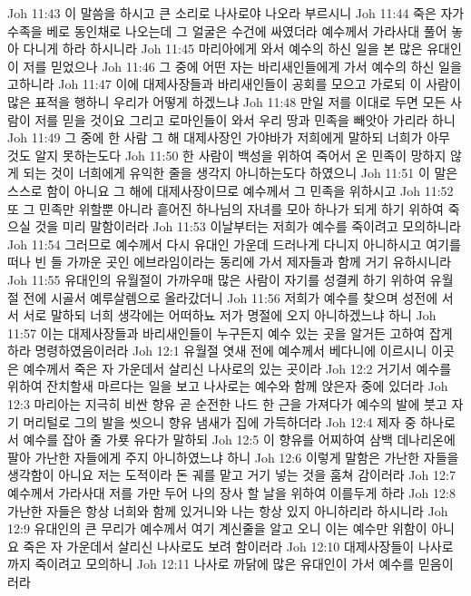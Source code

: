 Joh 11:43  이 말씀을 하시고 큰 소리로 나사로야 나오라 부르시니
Joh 11:44  죽은 자가 수족을 베로 동인채로 나오는데 그 얼굴은 수건에 싸였더라 예수께서 가라사대 풀어 놓아 다니게 하라 하시니라
Joh 11:45  마리아에게 와서 예수의 하신 일을 본 많은 유대인이 저를 믿었으나
Joh 11:46  그 중에 어떤 자는 바리새인들에게 가서 예수의 하신 일을 고하니라
Joh 11:47  이에 대제사장들과 바리새인들이 공회를 모으고 가로되 이 사람이 많은 표적을 행하니 우리가 어떻게 하겠느냐
Joh 11:48  만일 저를 이대로 두면 모든 사람이 저를 믿을 것이요 그리고 로마인들이 와서 우리 땅과 민족을 빼앗아 가리라 하니
Joh 11:49  그 중에 한 사람 그 해 대제사장인 가야바가 저희에게 말하되 너희가 아무 것도 알지 못하는도다
Joh 11:50  한 사람이 백성을 위하여 죽어서 온 민족이 망하지 않게 되는 것이 너희에게 유익한 줄을 생각지 아니하는도다 하였으니
Joh 11:51  이 말은 스스로 함이 아니요 그 해에 대제사장이므로 예수께서 그 민족을 위하시고
Joh 11:52  또 그 민족만 위할뿐 아니라 흩어진 하나님의 자녀를 모아 하나가 되게 하기 위하여 죽으실 것을 미리 말함이러라
Joh 11:53  이날부터는 저희가 예수를 죽이려고 모의하니라
Joh 11:54  그러므로 예수께서 다시 유대인 가운데 드러나게 다니지 아니하시고 여기를 떠나 빈 들 가까운 곳인 에브라임이라는 동리에 가서 제자들과 함께 거기 유하시니라
Joh 11:55  유대인의 유월절이 가까우매 많은 사람이 자기를 성결케 하기 위하여 유월절 전에 시골서 예루살렘으로 올라갔더니
Joh 11:56  저희가 예수를 찾으며 성전에 서서 서로 말하되 너희 생각에는 어떠하뇨 저가 명절에 오지 아니하겠느냐 하니
Joh 11:57  이는 대제사장들과 바리새인들이 누구든지 예수 있는 곳을 알거든 고하여 잡게 하라 명령하였음이러라
Joh 12:1  유월절 엿새 전에 예수께서 베다니에 이르시니 이곳은 예수께서 죽은 자 가운데서 살리신 나사로의 있는 곳이라
Joh 12:2  거기서 예수를 위하여 잔치할새 마르다는 일을 보고 나사로는 예수와 함께 앉은자 중에 있더라
Joh 12:3  마리아는 지극히 비싼 향유 곧 순전한 나드 한 근을 가져다가 예수의 발에 붓고 자기 머리털로 그의 발을 씻으니 향유 냄새가 집에 가득하더라
Joh 12:4  제자 중 하나로서 예수를 잡아 줄 가룟 유다가 말하되
Joh 12:5  이 향유를 어찌하여 삼백 데나리온에 팔아 가난한 자들에게 주지 아니하였느냐 하니
Joh 12:6  이렇게 말함은 가난한 자들을 생각함이 아니요 저는 도적이라 돈 궤를 맡고 거기 넣는 것을 훔쳐 감이러라
Joh 12:7  예수께서 가라사대 저를 가만 두어 나의 장사 할 날을 위하여 이를두게 하라
Joh 12:8  가난한 자들은 항상 너희와 함께 있거니와 나는 항상 있지 아니하리라 하시니라
Joh 12:9  유대인의 큰 무리가 예수께서 여기 계신줄을 알고 오니 이는 예수만 위함이 아니요 죽은 자 가운데서 살리신 나사로도 보려 함이러라
Joh 12:10  대제사장들이 나사로까지 죽이려고 모의하니
Joh 12:11  나사로 까닭에 많은 유대인이 가서 예수를 믿음이러라
